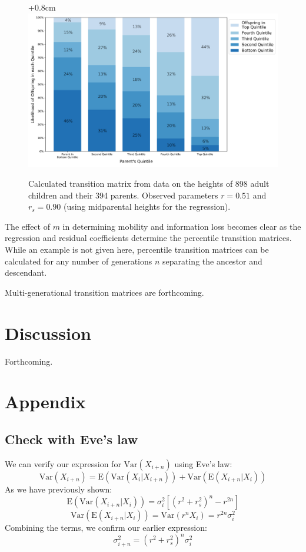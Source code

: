 \documentclass[letterpaper,10pt]{article} %
\begin{document}
\begin{figure}[h]
\centering
\advance\leftskip+0.8cm
\includegraphics[width=0.8\linewidth]{figures/galton_mobility.png} 
\caption{Calculated transition matrix from data on the heights of 898 adult children and their 394 parents. Observed parameters $r = 0.51$ and $r_s = 0.90$ (using midparental heights for the regression).}
\label{fig:old_galton_quintile}
\end{figure}


The effect of $m$ in determining mobility and information loss becomes clear as the regression and residual coefficients determine the percentile transition matrices. While an example is not given here, percentile transition matrices can be calculated for any number of generations $n$ separating the ancestor and descendant. 

Multi-generational transition matrices are forthcoming.

\section{Discussion}
Forthcoming.





\clearpage


\section{Appendix}

\subsection*{Check with Eve's law}
We can verify our expression for $\mathrm{Var}(X_{i+n})$ using Eve's law:
%
$$\mathrm{Var}(X_{i+n}) = \mathrm{E}(\mathrm{Var}(X_i|X_{i+n})) + \mathrm{Var}(\mathrm{E}(X_{i+n}|X_i))$$
%
As we have previously shown:
%
$$\mathrm{E}(\mathrm{Var}(X_{i+n}|X_i)) = \sigma_i^2 [(r^2+r_s^2)^n-r^{2n}]$$
$$\mathrm{Var}(\mathrm{E}(X_{i+n}|X_i)) = \mathrm{Var}(r^nX_i) = r^{2n}\sigma_i^2$$
%
Combining the terms, we confirm our earlier expression:
%
$$\sigma_{i+n}^2 = (r^2+r_s^2)^n  \sigma_i^2$$
\end{document}
